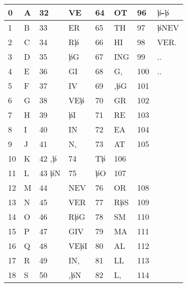 \begin{table}[htbp]
  \centering
\begin{tabular}{||p{0.3 in}|p{0.6 in}||p{0.3 in}|p{0.6 in}||p{0.3 in}|p{0.6 in}||p{0.3 in}|p{0.6 in}||} \hline
0  & A          & 32 & VE             & 64 & OT         & 96  & $\not b$-$\not b$   \\ \hline
1  & B          & 33 & ER             & 65 & TH         & 97  & $\not b$NEV         \\ \hline
2  & C          & 34 & R$\not b$      & 66 & HI         & 98  & VER.                \\ \hline
3  & D          & 35 & $\not b$G      & 67 & ING        & 99  & ..                  \\ \hline
4  & E          & 36 & GI             & 68 & G,         & 100 & ..                  \\ \hline
5  & F          & 37 & IV             & 69 & ,$\not b$G & 101 &                     \\ \hline
6  & G          & 38 & VE$\not b$     & 70 & GR         & 102 &                     \\ \hline
7  & H          & 39 & $\not b$I      & 71 & RE         & 103 &   \\ \hline
8  & I          & 40 & IN             & 72 & EA         & 104 &   \\ \hline
9  & J          & 41 & N,             & 73 & AT         & 105 &   \\ \hline
10 & K          & 42 ,$\not b$        & 74 & T$\not b$  & 106 &   \\ \hline
11 & L          & 43 $\not b$N        & 75 & $\not b$O  & 107 &   \\ \hline
12 & M          & 44 & NEV            & 76 & OR         & 108 &   \\ \hline
13 & N          & 45 & VER            & 77 & R$\not b$S & 109 &   \\ \hline
14 & O          & 46 & R$\not b$G     & 78 & SM         & 110 &   \\ \hline
15 & P          & 47 & GIV            & 79 & MA         & 111 &   \\ \hline
16 & Q          & 48 & VE$\not b$I    & 80 & AL         & 112 &   \\ \hline
17 & R          & 49 & IN,            & 81 & LL         & 113 &   \\ \hline
18 & S          & 50 & ,$\not b$N     & 82 & L,         & 114 &   \\ \hline

\end{tabular}
\end{table}
